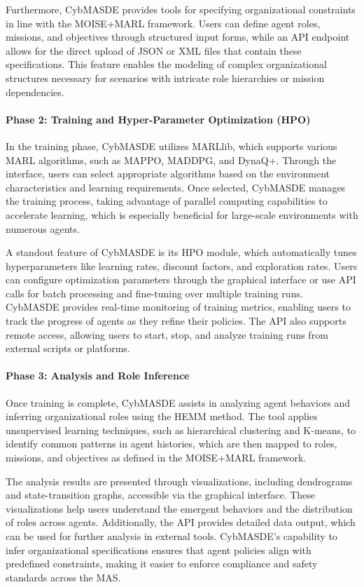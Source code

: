 \documentclass[sigconf,anonymous]{aamas}
\begin{document}
Furthermore, CybMASDE provides tools for specifying organizational constraints in line with the MOISE+MARL framework. Users can define agent roles, missions, and objectives through structured input forms, while an API endpoint allows for the direct upload of JSON or XML files that contain these specifications. This feature enables the modeling of complex organizational structures necessary for scenarios with intricate role hierarchies or mission dependencies.

\paragraph{Phase 2: Training and Hyper-Parameter Optimization (HPO)}

In the training phase, CybMASDE utilizes MARLlib, which supports various MARL algorithms, such as MAPPO, MADDPG, and DynaQ+. Through the interface, users can select appropriate algorithms based on the environment characteristics and learning requirements. Once selected, CybMASDE manages the training process, taking advantage of parallel computing capabilities to accelerate learning, which is especially beneficial for large-scale environments with numerous agents.

A standout feature of CybMASDE is its HPO module, which automatically tunes hyperparameters like learning rates, discount factors, and exploration rates. Users can configure optimization parameters through the graphical interface or use API calls for batch processing and fine-tuning over multiple training runs. CybMASDE provides real-time monitoring of training metrics, enabling users to track the progress of agents as they refine their policies. The API also supports remote access, allowing users to start, stop, and analyze training runs from external scripts or platforms.

\paragraph{Phase 3: Analysis and Role Inference}

Once training is complete, CybMASDE assists in analyzing agent behaviors and inferring organizational roles using the HEMM method. The tool applies unsupervised learning techniques, such as hierarchical clustering and K-means, to identify common patterns in agent histories, which are then mapped to roles, missions, and objectives as defined in the MOISE+MARL framework.

The analysis results are presented through visualizations, including dendrograms and state-transition graphs, accessible via the graphical interface. These visualizations help users understand the emergent behaviors and the distribution of roles across agents. Additionally, the API provides detailed data output, which can be used for further analysis in external tools. CybMASDE’s capability to infer organizational specifications ensures that agent policies align with predefined constraints, making it easier to enforce compliance and safety standards across the MAS.
\end{document}
